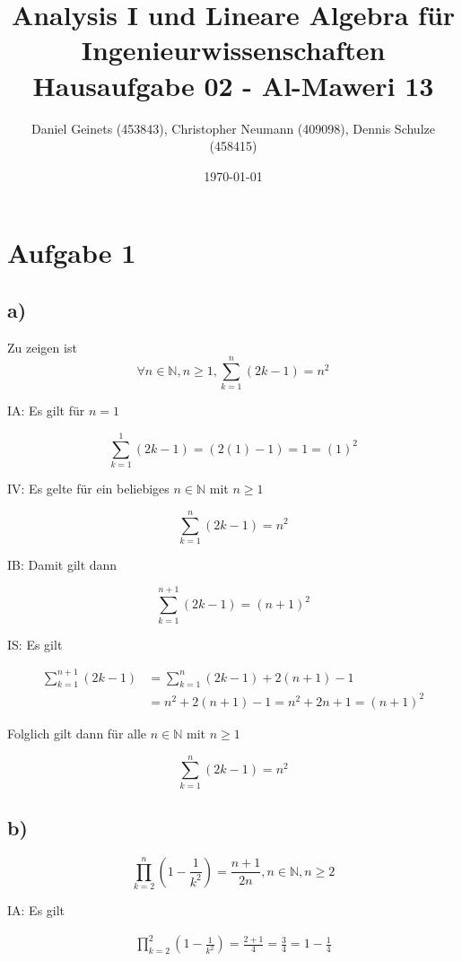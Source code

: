 \documentclass[a4paper, 11pt]{article}
\author{Daniel Geinets (453843), Christopher Neumann (409098), Dennis Schulze (458415)}
\date{\today}
\title{Analysis I und Lineare Algebra für Ingenieurwissenschaften \large  \\ Hausaufgabe 02 - Al-Maweri 13}
\begin{document}
\maketitle
\tableofcontents

\setcounter{secnumdepth}{0}
\newcommand{\tuple}[1]{\left(#1\right)}
\newcommand{\R}{\mathbb{R}}
\newcommand{\Z}{\mathbb{Z}}
\newcommand{\Q}{\mathbb{Q}}
\newcommand{\N}{\mathbb{N}}
\newcommand{\C}{\mathbb{C}}

\pagebreak

\section{Aufgabe 1}
\label{sec:orge279736}
\subsection{a)}
\label{sec:org8d73da6}
Zu zeigen ist
$$ \forall n \in \N, n \geq 1, \sum_{k=1}^{n} \tuple{2k - 1} = n^2 $$

IA:
    Es gilt für \(n = 1\)

$$ \sum_{k=1}^{1} \tuple{2k - 1} = (2(1) - 1) = 1 = (1)^2 $$

IV:
    Es gelte für ein beliebiges \(n \in \N\) mit \(n \geq 1\)

$$ \sum_{k=1}^{n} \tuple{2k - 1} = n^2 $$

IB:
    Damit gilt dann

$$ \sum_{k=1}^{n+1} \tuple{2k - 1} = (n + 1)^2 $$

IS:
    Es gilt

\begin{align*}
    \sum_{k=1}^{n+1} \tuple{2k - 1} &= \sum_{k=1}^{n} \tuple{2k - 1} + 2(n + 1) - 1 \\
    &= n^2 + 2(n + 1) - 1 = n^2 + 2n + 1 = (n + 1)^2
\end{align*}

Folglich gilt dann für alle \(n \in \N\) mit \(n \geq 1\)

$$ \sum_{k=1}^{n} \tuple{2k - 1} = n^2 $$

\subsection{b)}
\label{sec:org65aa1c1}
$$ \prod_{k=2}^{n} \tuple{1 - \frac{1}{k^2}} = \frac{n + 1}{2n}, n \in \N, n \geq 2 $$

IA:
  Es gilt

\begin{align*}
    \prod_{k = 2}^{2} \tuple{1 - \frac{1}{k^2}} = \frac{2 + 1}{4}
    = \frac{3}{4}
    = 1 - \frac{1}{4}
\end{align*}
\end{document}
